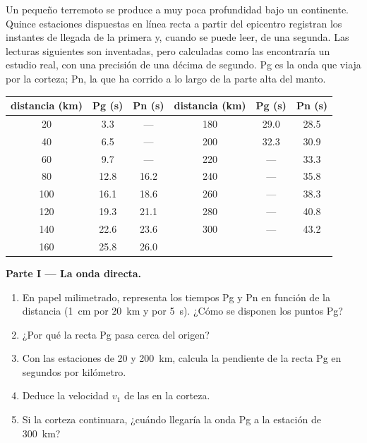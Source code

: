 \begin{problem}
\label{pb:g11:seismic-structure:1}
Un pequeño terremoto se produce a muy poca profundidad bajo un continente.
Quince estaciones dispuestas en línea recta a partir del epicentro registran
los instantes de llegada de la primera  y, cuando se puede leer, de una
segunda. Las lecturas siguientes son inventadas, pero calculadas como las
encontraría un estudio real, con una precisión de una décima de segundo. Pg es
la onda que viaja por la corteza; Pn, la que ha corrido a lo largo de la
parte alta del manto.

\begin{center}
\small
\begin{tabular}{|c|c|c||c|c|c|}
\hline
distancia (\unit{km}) & Pg (\unit{s}) & Pn (\unit{s}) & distancia (\unit{km}) & Pg (\unit{s}) & Pn (\unit{s}) \\ \hline
20 & 3.3 & --- & 180 & 29.0 & 28.5 \\ \hline
40 & 6.5 & --- & 200 & 32.3 & 30.9 \\ \hline
60 & 9.7 & --- & 220 & --- & 33.3 \\ \hline
80 & 12.8 & 16.2 & 240 & --- & 35.8 \\ \hline
100 & 16.1 & 18.6 & 260 & --- & 38.3 \\ \hline
120 & 19.3 & 21.1 & 280 & --- & 40.8 \\ \hline
140 & 22.6 & 23.6 & 300 & --- & 43.2 \\ \hline
160 & 25.8 & 26.0 & & & \\ \hline
\end{tabular}
\end{center}

\medskip
\noindent\textbf{Parte I --- La onda directa.}
\begin{enumerate}
  \item En papel milimetrado, representa los tiempos Pg y Pn en función de
        la distancia (\qty{1}{cm} por \qty{20}{km} y por \qty{5}{s}). ¿Cómo se
        disponen los puntos Pg?
  \item ¿Por qué la recta Pg pasa cerca del origen?
  \item Con las estaciones de 20 y \qty{200}{km}, calcula la pendiente de la
        recta Pg en segundos por kilómetro.
  \item Deduce la velocidad $v_1$ de las  en la corteza.
  \item Si la corteza continuara, ¿cuándo llegaría la onda Pg a la estación
        de \qty{300}{km}?
\end{enumerate}


\end{problem}
